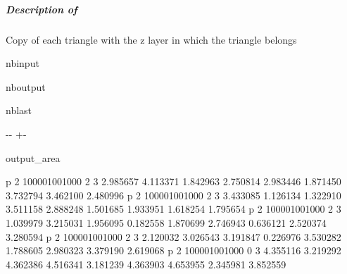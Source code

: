 \documentclass[letterpaper,10pt,english]{sphinxmanual}
\begin{document}
\subparagraph{Description of }
\label{\detokenize{misc_functionnalities:Description-of-s2v.can}}
\sphinxAtStartPar
Copy of each triangle with the z layer in which the triangle belongs

\begin{sphinxuseclass}{nbinput}
{
\begin{sphinxVerbatim}[commandchars=\\\{\}]
\llap{\color{nbsphinxin}[13]:\,\hspace{\fboxrule}\hspace{\fboxsep}}    
    
       
         
\end{sphinxVerbatim}
}

\end{sphinxuseclass}
\begin{sphinxuseclass}{nboutput}
\begin{sphinxuseclass}{nblast}
{

\kern-\sphinxverbatimsmallskipamount\kern-\baselineskip
\kern+\FrameHeightAdjust\kern-\fboxrule
\vspace{\nbsphinxcodecellspacing}

\begin{sphinxuseclass}{output_area}
\begin{sphinxuseclass}{}


\begin{sphinxVerbatim}[commandchars=\\\{\}]
p 2 100001001000 2  3 2.985657 4.113371 1.842963 2.750814 2.983446 1.871450 3.732794 3.462100 2.480996
p 2 100001001000 2  3 3.433085 1.126134 1.322910 3.511158 2.888248 1.501685 1.933951 1.618254 1.795654
p 2 100001001000 2  3 1.039979 3.215031 1.956095 0.182558 1.870699 2.746943 0.636121 2.520374 3.280594
p 2 100001001000 2  3 2.120032 3.026543 3.191847 0.226976 3.530282 1.788605 2.980323 3.379190 2.619068
p 2 100001001000 0  3 4.355116 3.219292 4.362386 4.516341 3.181239 4.363903 4.653955 2.345981 3.852559
\end{sphinxVerbatim}



\end{sphinxuseclass}
\end{sphinxuseclass}
}

\end{sphinxuseclass}
\end{sphinxuseclass}
\end{document}
